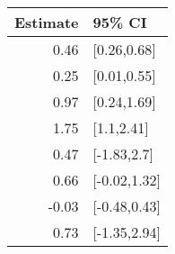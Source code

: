 \begin{tabular}{rl}
  \hline
Estimate & 95\% CI \\ 
  \hline
0.46 & [0.26,0.68] \\ 
  0.25 & [0.01,0.55] \\ 
  0.97 & [0.24,1.69] \\ 
  1.75 & [1.1,2.41] \\ 
  0.47 & [-1.83,2.7] \\ 
  0.66 & [-0.02,1.32] \\ 
  -0.03 & [-0.48,0.43] \\ 
  0.73 & [-1.35,2.94] \\ 
   \hline
\end{tabular}

